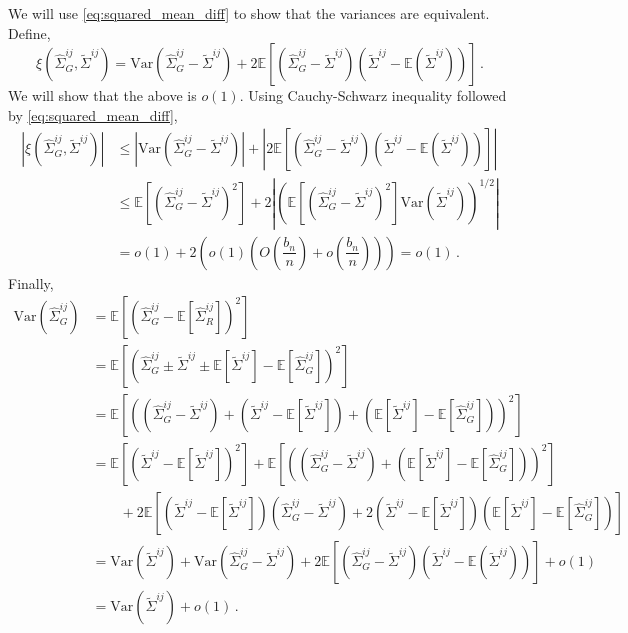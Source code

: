 \documentclass[12pt]{article}
\newcommand{\E}{\mathbb{E}}
\newcommand{\Var}{\text{Var}}
\theoremstyle{remark}
\begin{document}
%
We will use \eqref{eq:squared_mean_diff} to show that the variances are equivalent. Define,
\[
\xi\left(\hat{\Sigma}_{G}^{ij}, \tilde{\Sigma}^{ij} \right) = \Var\left(\hat{\Sigma}_{G}^{ij} - \tilde{\Sigma}^{ij} \right) + 2 \E\left[ \left(\hat{\Sigma}_{G}^{ij} -  \tilde{\Sigma}^{ij} \right) \left(\tilde{\Sigma}^{ij}  - \E \left( \tilde{\Sigma}^{ij} \right) \right) \right]\,.
\]
We will show that the above is $o(1)$. Using Cauchy-Schwarz inequality followed by \eqref{eq:squared_mean_diff},
\begin{align*}
\left|  \xi\left(\hat{\Sigma}_{G}^{ij}, \tilde{\Sigma}^{ij} \right) \right| & \leq \left| \Var\left(\hat{\Sigma}_{G}^{ij} -  \tilde{\Sigma}^{ij} \right) \right| + \left| 2 \E\left[ \left(\hat{\Sigma}_{G}^{ij} - \tilde{\Sigma}^{ij} \right) \left(\tilde{\Sigma}^{ij}  - \E \left( \tilde{\Sigma}^{ij} \right) \right) \right]\right| \\ 
& \leq \E\left[\left(\hat{\Sigma}_{G}^{ij} -  \tilde{\Sigma}^{ij} \right)^2 \right] + 2 \left| \left(\E\left[ \left(\hat{\Sigma}_{G}^{ij} - \tilde{\Sigma}^{ij} \right)^2 \right]  \Var\left(\tilde{\Sigma}^{ij}  \right)   \right)^{1/2}\right| \\ 
& = o(1) + 2\left(o(1) \left(O\left( \dfrac{b_n}{n}\right)  + o\left( \dfrac{b_n}{n}\right) \right)  \right) = o(1)\,.
\end{align*}
%
Finally,
\begin{align*}
 \Var\left(\hat{\Sigma}_{G}^{ij} \right)  & = \E \left[ \left(\hat{\Sigma}_{G}^{ij}  - \E \left[\hat{\Sigma}_{R}^{ij}  \right] \right)^2 \right]\\
& = \E \left[ \left(\hat{\Sigma}_{G}^{ij} \pm \tilde{\Sigma}^{ij} \pm \E \left[ \tilde{\Sigma}^{ij}\right] - \E \left[\hat{\Sigma}_{G}^{ij}  \right] \right)^2 \right]\\
& = \E\left[ \left( \left(\hat{\Sigma}_{G}^{ij} - \tilde{\Sigma}^{ij} \right) + \left(\tilde{\Sigma}^{ij}  - \E\left[\tilde{\Sigma}^{ij}\right]\right) + \left(\E\left[\tilde{\Sigma}^{ij}\right] - \E \left[\hat{\Sigma}_{G}^{ij}  \right] \right)  \right)^2 \right] \\ 
& =  \E\left[ \left(\tilde{\Sigma}^{ij}  - \E\left[\tilde{\Sigma}^{ij}\right]\right)^2 \right] + \E \left[ \left(\left(\hat{\Sigma}_{G}^{ij} - \tilde{\Sigma}^{ij} \right) + \left(\E\left[\tilde{\Sigma}^{ij}\right] - \E \left[\hat{\Sigma}_{G}^{ij}  \right] \right) \right)^2 \right] \\
& \quad \quad + 2\E\left[\left(\tilde{\Sigma}^{ij}  - \E\left[\tilde{\Sigma}^{ij}\right]\right) \left(\hat{\Sigma}_{G}^{ij} - \tilde{\Sigma}^{ij} \right) + 2 \left(\tilde{\Sigma}^{ij}  - \E\left[\tilde{\Sigma}^{ij}\right]\right) \left(\E \left[\tilde{\Sigma}^{ij}\right] - \E \left[\hat{\Sigma}_{G}^{ij}  \right] \right)\right]\\
& = \Var\left( \tilde{\Sigma}^{ij}\right) + \Var\left(\hat{\Sigma}_{G}^{ij} - \tilde{\Sigma}^{ij} \right) + 2 \E\left[ \left(\hat{\Sigma}_{G}^{ij} -  \tilde{\Sigma}^{ij} \right) \left(\tilde{\Sigma}^{ij}  - \E \left( \tilde{\Sigma}^{ij} \right) \right) \right] + o(1)\\
& = \Var\left( \tilde{\Sigma}^{ij}\right) + o(1)\,.
\end{align*}
\end{document}
